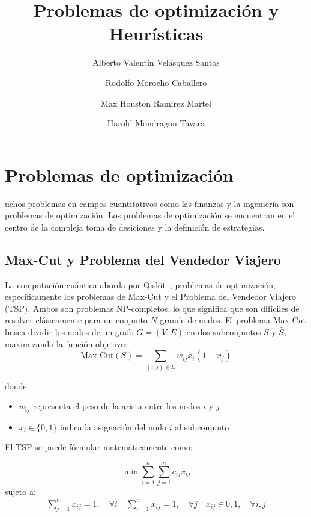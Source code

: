 \documentclass[9pt,a4paper,twoside]{rho-class/rho}
\title{ Problemas de optimización y Heurísticas}
\author[,$\dagger$]{Alberto Valentín Velásquez Santos}
\author[,$\dagger$]{Rodolfo Morocho Caballero}
\author[,$\dagger$]{Max Houston Ramirez Martel}
\author[,$\dagger$]{Harold Mondragon Tavara}
\affil[$\dagger$]{Estos autores contribuyeron igualmente a este trabajo.}
\begin{document}
	
    \maketitle
    \section{Problemas de optimización}

        uchos problemas en campos cuantitativos como las finanzas y la ingeniería son problemas de optimización. Los problemas de optimización se encuentran en el centro de la compleja toma de desiciones y la definición de estrategias.
    
        \subsection{Max-Cut y Problema del Vendedor Viajero}
            La computación cuántica aborda por Qiskit~\cite{qiskit2024}, problemas de optimización, específicamente los problemas de Max-Cut y el Problema del Vendedor Viajero (TSP). Ambos son problemas NP-completos, lo que significa que son difíciles de resolver clásicamente para un conjunto $N$ grande de nodos.
            El problema Max-Cut busca dividir los nodos de un grafo $G = (V,E)$ en dos subconjuntos $S$ y $\bar{S}$, maximizando la función objetivo:
            \begin{equation}
                \text{Max-Cut}(S) = \sum_{(i,j) \in E} w_{ij}x_i(1-x_j)
            \end{equation}

            donde:
            \begin{itemize}
                \item $w_{ij}$ representa el peso de la arista entre los nodos $i$ y $j$
                \item $x_i \in \{0,1\}$ indica la asignación del nodo $i$ al subconjunto
            \end{itemize}
            El TSP se puede fórmular matemáticamente como:

            \begin{equation}
                \min \sum_{i=1}^{n} \sum_{j=1}^{n} c_{ij}x_{ij}
            \end{equation}
            sujeto a:
            \begin{align} \sum_{j=1}^{n} x_{ij} = 1, \quad \forall i \quad \sum_{i=1}^{n} x_{ij} = 1, \quad \forall j \quad x_{ij} \in {0,1}, \quad \forall i,j \end{align}
\end{document}
